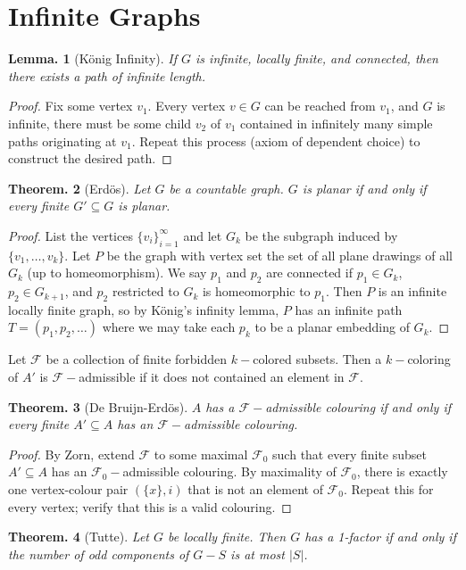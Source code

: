 \documentclass[11pt, a4paper]{memoir}
\theoremstyle{change}
\newtheorem{theorem}{Theorem.}[section]
\newtheorem{lemma}[theorem]{Lemma.}
\theoremstyle{plain}
\theoremstyle{nonumberplain}
\newtheorem{proof}{Proof}
\numberwithin{equation}{section}
\begin{document}
\section{Infinite Graphs}
\begin{lemma}[König Infinity]
    If $G$ is infinite, locally finite, and connected, then there exists a path of infinite length.
\end{lemma}
\begin{proof}
    Fix some vertex $v_1$.
    Every vertex $v\in G$ can be reached from $v_1$, and $G$ is infinite, there must be some child $v_2$ of $v_1$ contained in infinitely many simple paths originating at $v_1$.
    Repeat this process (axiom of dependent choice) to construct the desired path.
\end{proof}
\begin{theorem}[Erdös]
    Let $G$ be a countable graph.
    $G$ is planar if and only if every finite $G'\subseteq G$ is planar.
\end{theorem}
\begin{proof}
    List the vertices $\{v_i\}_{i=1}^\infty$ and let $G_k$ be the subgraph induced by $\{v_1,\ldots,v_k\}$.
    Let $P$ be the graph with vertex set the set of all plane drawings of all $G_k$ (up to homeomorphism).
    We say $p_1$ and $p_2$ are connected if $p_1\in G_k$, $p_2\in G_{k+1}$, and $p_2$ restricted to $G_k$ is homeomorphic to $p_1$.
    Then $P$ is an infinite locally finite graph, so by König's infinity lemma, $P$ has an infinite path $T=(p_1,p_2,\ldots)$ where we may take each $p_k$ to be a planar embedding of $G_k$.
\end{proof}
Let $\mathcal{F}$ be a collection of finite forbidden $k-$colored subsets.
Then a $k-$coloring of $A'$ is $\mathcal{F}-$admissible if it does not contained an element in $\mathcal{F}$.
\begin{theorem}[De Bruijn-Erdös]
    $A$ has a $\mathcal{F}-$admissible colouring if and only if every finite $A'\subseteq A$ has an $\mathcal{F}-$admissible colouring.
\end{theorem}
\begin{proof}
    By Zorn, extend $\mathcal{F}$ to some maximal $\mathcal{F}_0$ such that every finite subset $A'\subseteq A$ has an $\mathcal{F}_0-$admissible colouring.
    By maximality of $\mathcal{F}_0$, there is exactly one vertex-colour pair $(\{x\},i)$ that is not an element of $\mathcal{F}_0$.
    Repeat this for every vertex; verify that this is a valid colouring.
\end{proof}
\begin{theorem}[Tutte]
    Let $G$ be locally finite.
    Then $G$ has a 1-factor if and only if the number of odd components of $G-S$ is at most $|S|$.
\end{theorem}
\end{document}
